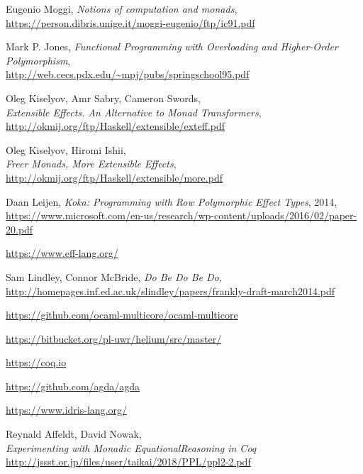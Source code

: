\documentclass[declaration,inz,english,shortabstract]{iithesis}
\begin{document}
\begin{thebibliography}{1}
        Eugenio Moggi, \textit{Notions of computation and monads}, \\
        \url{https://person.dibris.unige.it/moggi-eugenio/ftp/ic91.pdf}

        Mark P. Jones,
        \textit{Functional Programming with Overloading and Higher-Order Polymorphism}, \\
        \url{http://web.cecs.pdx.edu/~mpj/pubs/springschool95.pdf}

        Oleg Kiselyov, Amr Sabry, Cameron Swords, \\
        \textit{Extensible Effects. An Alternative to Monad Transformers}, \\
        \url{http://okmij.org/ftp/Haskell/extensible/exteff.pdf}

        Oleg Kiselyov, Hiromi Ishii, \\
        \textit{Freer Monads, More Extensible Effects}, \\
        \url{http://okmij.org/ftp/Haskell/extensible/more.pdf}

        Daan Leijen,
        \textit{Koka: Programming with Row Polymorphic Effect Types}, 2014, \\
        \url{https://www.microsoft.com/en-us/research/wp-content/uploads/2016/02/paper-20.pdf}

        \url{https://www.eff-lang.org/}

        Sam Lindley, Connor McBride, \textit{Do Be Do Be Do}, \\
        \url{http://homepages.inf.ed.ac.uk/slindley/papers/frankly-draft-march2014.pdf}

        \url{https://github.com/ocaml-multicore/ocaml-multicore}
        
        \url{https://bitbucket.org/pl-uwr/helium/src/master/}

        \url{https://coq.io}

        \url{https://github.com/agda/agda}

        \url{https://www.idris-lang.org/}

        Reynald Affeldt, David Nowak, \\
        \textit{Experimenting with Monadic EquationalReasoning in Coq} \\
        \url{http://jssst.or.jp/files/user/taikai/2018/PPL/ppl2-2.pdf}


\end{thebibliography}
\end{document}

